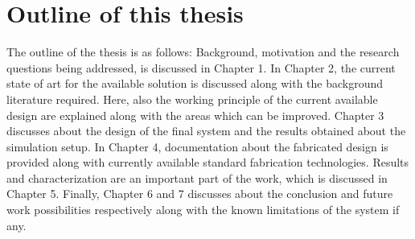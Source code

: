 \documentclass[../report.tex]{subfiles}
\begin{document}
	\section{Outline of this thesis}
The outline of the thesis is as follows: Background, motivation and the research questions being addressed, is discussed in Chapter 1. In Chapter 2, the current state of art for the available solution is discussed along with the background literature required. Here, also the working principle of the current available design are explained along with the areas which can be improved. Chapter 3 discusses about the design of the final system and the results obtained about the simulation setup. In Chapter 4, documentation about the fabricated design is provided along with currently available standard fabrication technologies. Results and characterization are an important part of the work, which is discussed in Chapter 5. Finally, Chapter 6 and 7 discusses about the conclusion and future work possibilities respectively along with the known limitations of the system if any.  
	
\end{document}
